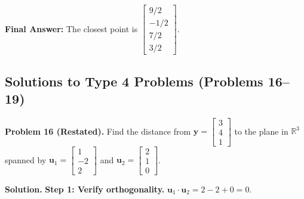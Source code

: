 \documentclass[11pt, letterpaper]{article}
\theoremstyle{definition}
\theoremstyle{remark}
\newcommand{\R}{\mathbb{R}}
\begin{document}
\textbf{Final Answer:} The closest point is $\begin{bmatrix} 9/2 \\ -1/2 \\ 7/2 \\ 3/2 \end{bmatrix}$.

\subsection{Solutions to Type 4 Problems (Problems 16--19)}

\textbf{Problem 16 (Restated).} Find the distance from $\mathbf{y} = \begin{bmatrix} 3 \\ 4 \\ 1 \end{bmatrix}$ to the plane in $\R^3$ spanned by $\mathbf{u}_1 = \begin{bmatrix} 1 \\ -2 \\ 2 \end{bmatrix}$ and $\mathbf{u}_2 = \begin{bmatrix} 2 \\ 1 \\ 0 \end{bmatrix}$.

\textbf{Solution.}
\textbf{Step 1: Verify orthogonality.} $\mathbf{u}_1 \cdot \mathbf{u}_2 = 2 - 2 + 0 = 0$.
\end{document}
